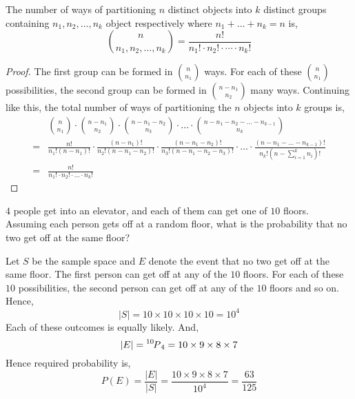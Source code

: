\begin{theorem}
    The number of ways of partitioning $n$ distinct objects into $k$ distinct
groups containing $n_1, n_2, \dots, n_k$ object respectively where $n_1 +
\dots + n_k = n$ is,
\begin{equation*}
    {n \choose {n_1, n_2, \dots, n_k}} = 
    \frac{n!}{n_1! \cdot n_2! \cdot \cdots \cdot n_k!}
\end{equation*}
\end{theorem}
\begin{proof}
    The first group can be formed in $n \choose n_1$ ways. For each of these
$n \choose n_1$ possibilities, the second group can be formed in ${n - n_1}
\choose n_2$ many ways. Continuing like this, the total number of ways of
partitioning the $n$ objects into $k$ groups is, 
\begin{align*}
    &{n \choose n_1} \cdot {{n - n_1} \choose n_2} \cdot
    {{n - n_1 - n_2} \choose n_3} \cdot \dots \cdot 
    {{n - n_1 - n_2 - \dots - n_{k-1}} \choose n_k}                          \\
    =& \frac{n!}{n_1!(n-n_1)!} \cdot \frac{(n - n_1)!}{n_2! (n - n_1 - n_2)!}
       \cdot \frac{(n - n_1 - n_2)!}{n_3!(n - n_1 - n_2 - n_3)!} \cdot
       \dots \cdot \frac{(n - n_1 - \dots - n_{k-1})!}{n_k! (n - \sum_{i=1}^k
       n_i)!}                                                                \\
    =& \frac{n!}{n_1! \cdot n_2! \cdot \dots \cdot n_k!}
\end{align*}
\end{proof}

\begin{example}
    $4$ people get into an elevator, and each of them can get one of $10$
floors. Assuming each person gets off at a random floor, what is the
probability that no two get off at the same floor?
\end{example}

\begin{solution}
    Let $S$ be the sample space and $E$ denote the event that no two get off at
the same floor. The first person can get off at any of the $10$ floors. For
each of these $10$ possibilities, the second person can get off at any of the
$10$ floors and so on. Hence,
    \begin{equation*}
        \vert S \vert = 10 \times 10 \times 10 \times 10 = 10^4
    \end{equation*}
    Each of these outcomes is equally likely. And, 
    \begin{equation*}
        \vert E \vert = \perm[10]{4} = 10 \times 9 \times 8 \times 7
    \end{equation*}
    Hence required probability is, 
    \begin{equation*}
        P(E) = \frac{\vert E \vert}{\vert S \vert} 
             = \frac{10 \times 9 \times 8 \times 7}{10^4}
             = \frac{63}{125}
    \end{equation*}
\end{solution}

